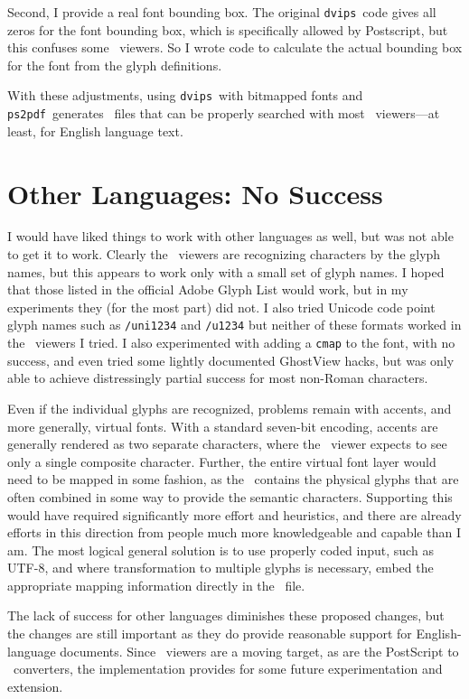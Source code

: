 \documentclass{ltugboat}
\def\PDF{\acro{PDF}}
\def\dvips{\texttt{dvips}}
\def\ps2pdf{\texttt{ps2pdf}}
\begin{document}
Second, I provide a real font bounding
box.  The original \dvips\ code gives all zeros for the font
bounding box, which is specifically allowed by Postscript,
but this confuses some \PDF\ viewers.  So I wrote code to
calculate the actual bounding box for the font from the
glyph definitions.

With these adjustments, using \dvips\ with bitmapped fonts
and \ps2pdf\ generates \PDF\ files that can be properly
searched with most \PDF\ viewers---at least, for English
language text.

\section{Other Languages: No Success}

I would have liked things to work with other languages as
well, but was not able to get it to work.  Clearly the
\PDF\ viewers are recognizing characters by the glyph
names, but this appears to work only with a small set of
glyph names.  I hoped that those listed in the official
Adobe Glyph List\cite{AGL} would work, but in my experiments they
(for the most part) did not.  I also tried Unicode code
point glyph names such as \texttt{/uni1234} and \texttt{/u1234}
but neither of these formats worked in the \PDF\ viewers
I tried.  I also experimented with adding a \texttt{cmap}
to the font, with no success, and even tried some lightly
documented GhostView hacks, but was only able to achieve
distressingly partial success for most non-Roman characters.

Even if the individual glyphs are recognized, problems remain
with accents, and more generally, virtual fonts.
With a standard seven-bit encoding, accents are generally
rendered as two separate characters, where the \PDF\ viewer
expects to see only a single composite character.  Further,
the entire virtual font layer would need to be mapped in
some fashion, as the \PDF\ contains the physical glyphs
that are often combined in some way to provide the semantic
characters.  Supporting this would have required significantly
more effort and heuristics, and there are already efforts in
this direction from people much more knowledgeable and capable
than I am.  The most logical general solution is to use properly
coded input, such as UTF-8, and where transformation to multiple
glyphs is necessary, embed the appropriate mapping information
directly in the \PDF\ file.

The lack of success for other languages diminishes these
proposed changes, but the changes are still important as they
do provide reasonable support for English-language documents.
Since \PDF\ viewers are a moving target, as are the PostScript
to \PDF\ converters, the implementation provides for some future
experimentation and extension.
\end{document}
